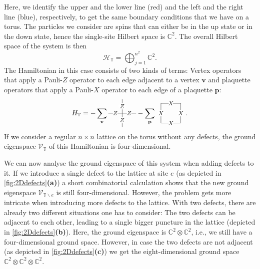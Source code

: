 Here, we identify the upper and the lower line (red) and the left and the right line (blue), respectively, to get the same boundary conditions that we have on a torus. The particles we consider are spins that can either be in the up state or in the down state, hence the single-site Hilbert space is $\mathbb{C}^2$. The overall Hilbert space of the system is then
\begin{equation}
\mathcal{H}_\mathbb{T} =\bigoplus_{j=1}^{n^2}\mathbb{C}^2.
\end{equation}
The Hamiltonian in this case consists of two kinds of terms: Vertex operators that apply a Pauli-$Z$ operator to each edge adjacent to a vertex $\mathbf{v}$ and plaquette operators that apply a Pauli-$X$ operator to each edge of a plaquette $\mathbf{p}$:
\begin{equation}
\label{eq:TCham}
H_\mathbb{T}=-\sum_\mathbf{v}
\begin{tikzpicture}[scale=1.4,baseline={([yshift=-3pt]current bounding box.center)}]
\draw (0,0.5) -- (1,0.5);
\draw (0.5,-0) -- (0.5,1);
\draw[fill=white,draw=white] (0.25,0.5) circle (0.08cm);
\draw[fill=white,draw=white] (0.5,0.25) circle (0.11cm);
\draw[fill=white,draw=white] (0.75,0.5) circle (0.08cm);
\draw[fill=white,draw=white] (0.5,0.75) circle (0.11cm);
\node at (0.25,0.5) {\footnotesize $Z$};
\node at (0.5,0.25) {\footnotesize $Z$};
\node at (0.75,0.5) {\footnotesize $Z$};
\node at (0.5,0.75) {\footnotesize $Z$};
\end{tikzpicture}
-\sum_\mathbf{p}
\begin{tikzpicture}[baseline={([yshift=-3pt]current bounding box.center)}]
\draw (0,0) -- (0,1) -- (1,1) -- (1,0) -- cycle;
\draw[fill=white,draw=white] (0.5,0) circle (0.1cm);
\draw[fill=white,draw=white] (0,0.5) circle (0.15cm);
\draw[fill=white,draw=white] (0.5,1) circle (0.1cm);
\draw[fill=white,draw=white] (1,0.5) circle (0.15cm);
\node at (0.5,0) {\footnotesize $X$};
\node at (1,0.5) {\footnotesize $X$};
\node at (0.5,1) {\footnotesize $X$};
\node at (0,0.5) {\footnotesize $X$};
\end{tikzpicture}.
\end{equation}
If we consider a regular $n\times n$ lattice on the torus without any defects, the ground eigenspace $\mathcal{V}_\mathbb{T}$ of this Hamiltonian is four-dimensional.

We can now analyse the ground eigenspace of this system when adding defects to it. If we introduce a single defect to the lattice at site $e$ (as depicted in \cref{fig:2Ddefects}\textbf{(a)}) a short combinatorial calculation shows that the new ground eigenspace $\mathcal{V}_{\mathbb{T}\backslash e}$ is still four-dimensional. However, the problem gets more intricate when introducing more defects to the lattice. With two defects, there are already two different situations one has to consider: The two defects can be adjacent to each other, leading to a single bigger puncture in the lattice (depicted in \cref{fig:2Ddefects}\textbf{(b)}). Here, the ground eigenspace is $\mathbb{C}^2\otimes \mathbb{C}^2$, i.e., we still have a four-dimensional ground space. However, in case the two defects are not adjacent (as depicted in \cref{fig:2Ddefects}\textbf{(c)}) we get the eight-dimensional ground space $\mathbb{C}^2\otimes\mathbb{C}^2\otimes\mathbb{C}^2$.

